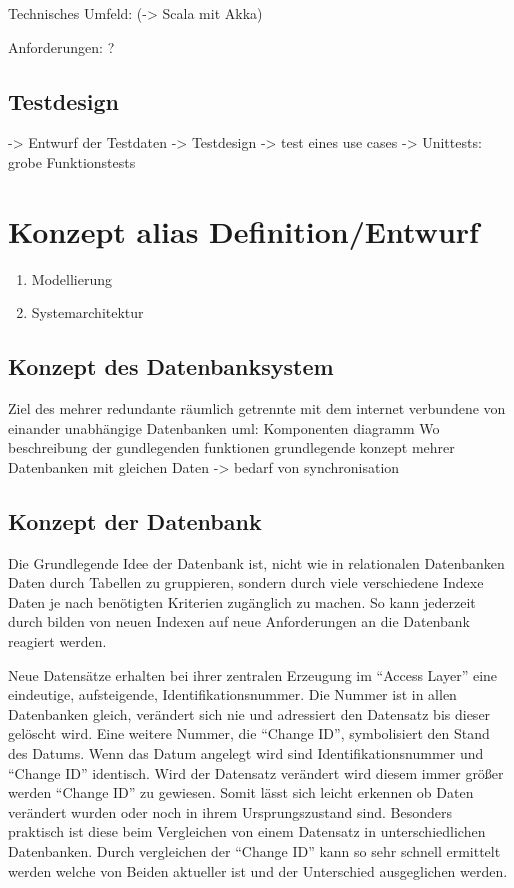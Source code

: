 \documentclass[a4paper,11pt,oneside,%
headsepline,												%
footsepline,												%
bibtotocnumbered									%
]{scrreprt}
\begin{document}
Technisches Umfeld:
(-> Scala mit Akka)

Anforderungen:
?

\section{Testdesign}
-> Entwurf der Testdaten
-> Testdesign -> test eines use cases
-> Unittests: grobe Funktionstests 


\chapter{Konzept alias Definition/Entwurf}

		\begin{enumerate}[1.]
			\item Modellierung
			\item Systemarchitektur
		\end{enumerate}
		
\section{Konzept des Datenbanksystem}
Ziel des
mehrer redundante räumlich getrennte mit dem internet verbundene von einander unabhängige Datenbanken
uml: Komponenten diagramm
Wo beschreibung der gundlegenden funktionen
grundlegende konzept mehrer Datenbanken mit gleichen Daten -> bedarf von synchronisation

\section{Konzept der Datenbank}
Die Grundlegende Idee der Datenbank ist, nicht wie in relationalen Datenbanken Daten durch Tabellen zu gruppieren, sondern durch viele verschiedene Indexe Daten je nach benötigten Kriterien  zugänglich zu machen. So kann jederzeit durch bilden von neuen Indexen auf neue Anforderungen an die Datenbank reagiert werden.

Neue Datensätze erhalten bei ihrer zentralen Erzeugung im \enquote{Access Layer} eine eindeutige, aufsteigende, Identifikationsnummer. Die Nummer ist in allen Datenbanken gleich, verändert sich nie und adressiert den Datensatz bis dieser gelöscht wird. Eine weitere Nummer, die \enquote{Change ID}, symbolisiert den Stand des Datums. Wenn das Datum angelegt wird sind Identifikationsnummer und \enquote{Change ID} identisch. Wird der Datensatz verändert wird diesem immer größer werden \enquote{Change ID} zu gewiesen. Somit lässt sich leicht erkennen ob Daten verändert wurden oder noch in ihrem Ursprungszustand sind. Besonders praktisch ist diese beim Vergleichen von einem Datensatz in unterschiedlichen Datenbanken. Durch vergleichen der \enquote{Change ID} kann so sehr schnell ermittelt werden welche von Beiden aktueller ist und der Unterschied ausgeglichen werden.
\end{document}
